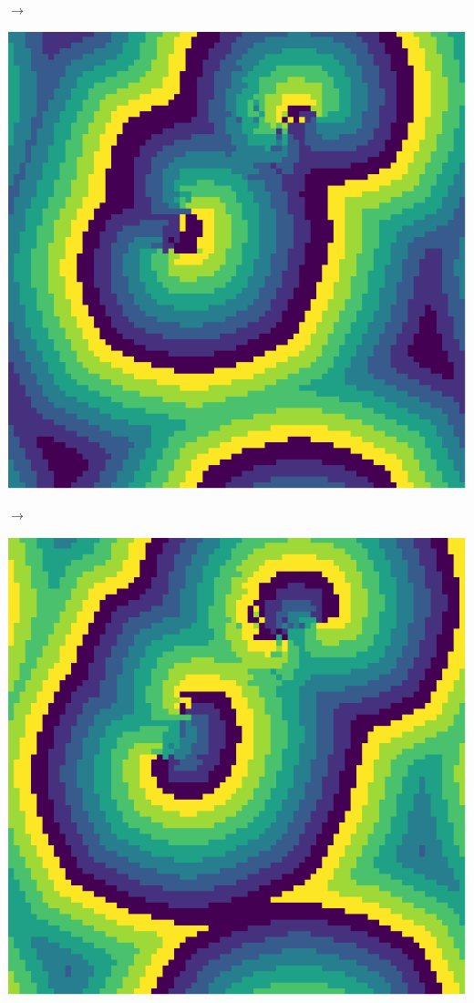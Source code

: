 \documentclass[12pt, a4paper]{article}
\begin{document}
\begin{center}
\begin{minipage}{.17\linewidth}
            \end{minipage}
            $\rightarrow$
            \begin{minipage}{.17\linewidth}
                \includegraphics[scale=0.15]{img/part2/step5.png}
            \end{minipage}
            $\rightarrow$
            \begin{minipage}{.17\linewidth}
                \includegraphics[scale=0.15]{img/part2/step6.png}

\end{minipage}
\end{center}
\end{document}
